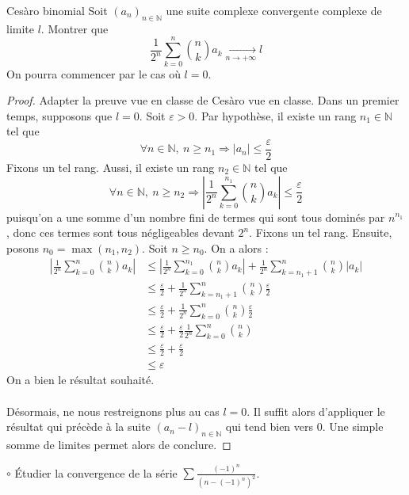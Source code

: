 \documentclass[french,a4paper]{article}
\newcommand{\N}{\mathbb{N}}
\theoremstyle{plain}
\theoremstyle{definition}
\theoremstyle{remark}
\begin{document}
\begin{ex}{Cesàro binomial}
	Soit $(a_n)_{n \in\N}$ une suite complexe convergente complexe de limite $l$. Montrer que $$\frac{1}{2^n}\sum_{k=0}^{n}\binom{n}{k}a_k \xrightarrow[n\to+\infty]{}l $$ On pourra commencer par le cas où $l=0$.
\end{ex}
\begin{proof}
	Adapter la preuve vue en classe de Cesàro vue en classe. Dans un premier temps, supposons que $l=0$. Soit $\varepsilon>0$. Par hypothèse, il existe un rang $n_1 \in \N$ tel que $$\forall n \in \N, \ n \geqslant n_1 \Longrightarrow \lvert a_n\rvert\leqslant\frac\varepsilon2$$ Fixons un tel rang. Aussi, il existe un rang $n_2 \in \N$ tel que $$\forall n \in \N, \ n \geqslant n_2 \Longrightarrow\left\lvert\frac{1}{2^n}\sum_{k=0}^{n_1}\binom{n}{k}a_k\right\rvert\leqslant\frac\varepsilon2$$ puisqu'on a une somme d'un nombre fini de termes qui sont tous dominés par $n^{n_1}$, donc ces termes sont tous négligeables devant $2^n$. Fixons un tel rang. Ensuite, posons $n_0=\max(n_1, n_2)$. Soit $n\geqslant n_0$. On a alors :
	\begin{align*}
		\left\lvert\frac{1}{2^n}\sum_{k=0}^{n}\binom{n}{k}a_k\right\rvert &\leqslant \left\lvert\frac{1}{2^n}\sum_{k=0}^{n_1}\binom{n}{k}a_k\right\rvert + \frac{1}{2^n}\sum_{k=n_1+1}^{n}\binom{n}{k}\lvert a_k\rvert\\
		& \leqslant \frac\varepsilon2 + \frac{1}{2^n}\sum_{k=n_1+1}^{n}\binom{n}{k}\frac\varepsilon2 \\
		& \leqslant \frac\varepsilon2 + \frac{1}{2^n}\sum_{k=0}^{n}\binom{n}{k}\frac\varepsilon2 \\
		& \leqslant \frac\varepsilon2 + \frac\varepsilon2 \frac{1}{2^n}\sum_{k=0}^{n}\binom{n}{k} \\
		& \leqslant \frac\varepsilon2 + \frac\varepsilon2 \\
		& \leqslant \varepsilon
	\end{align*}
	On a bien le résultat souhaité. \\ \\ Désormais, ne nous restreignons plus au cas $l=0$. Il suffit alors d'appliquer le résultat qui précède à la suite $(a_n-l)_{n \in \N}$ qui tend bien vers 0. Une simple somme de limites permet alors de conclure.
\end{proof}

\begin{ex}[Moulin.21]{$\circ$}
	Étudier la convergence de la série $\displaystyle\sum\frac{(-1)^n}{\left(n-(-1)^n\right)^2}$.
\end{ex}
\end{document}
